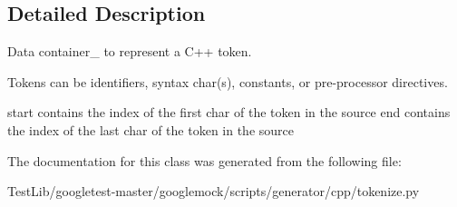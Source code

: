 \subsection{Detailed Description}
\begin{DoxyVerb}Data container_ to represent a C++ token.

Tokens can be identifiers, syntax char(s), constants, or
pre-processor directives.

start contains the index of the first char of the token in the source
end contains the index of the last char of the token in the source
\end{DoxyVerb}
 

The documentation for this class was generated from the following file\+:\begin{DoxyCompactItemize}
\item 
Test\+Lib/googletest-\/master/googlemock/scripts/generator/cpp/tokenize.\+py\end{DoxyCompactItemize}
